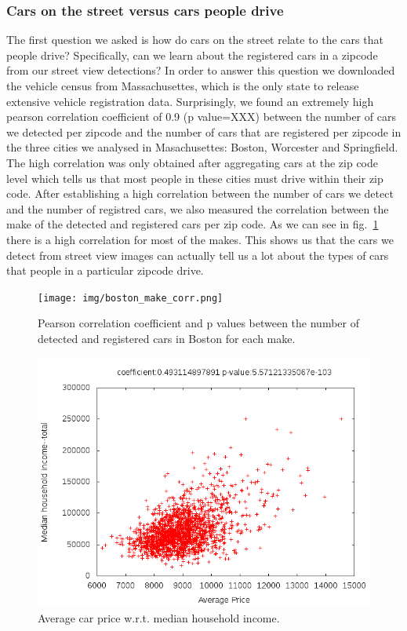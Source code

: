 \documentclass[10pt,twocolumn,letterpaper]{article}
\begin{document}
\subsubsection{Cars on the street versus cars people drive}
The first question we asked is how do cars on the street relate to the cars that people drive? Specifically,
can we learn about the registered cars in a zipcode from our street view detections?
In order to answer this question we downloaded the vehicle census from Massachusettes, which is the only state to release extensive vehicle registration data. Surprisingly, we found an extremely high pearson correlation coefficient of 0.9 (p value=XXX) between the number of cars we detected per zipcode and the number of cars that are registered per zipcode in the three cities we analysed in Masachusettes: Boston, Worcester and Springfield. The high correlation was only obtained after aggregating cars at the zip code level which tells us that most people in these cities must drive within their zip code. 
After establishing a high correlation between the number of cars we detect and the number of registred cars, we also measured the correlation between the make of the detected and registered cars per zip code. As we can see in fig.~\ref{fig:ma_corrs} there is a high correlation for most of the makes. This shows us that the cars we detect from street view images can actually tell us a lot about the types of cars that people in a particular zipcode drive.

\begin{figure} [t]
\begin{center}
\texttt{[image: img/boston\_make\_corr.png]}
\end{center}
\caption {Pearson correlation coefficient and p values between the number of detected and registered cars in Boston for each make.}
\label{fig:ma_corrs}
\end{figure}


\begin{figure}[t]
\begin{center}
   \includegraphics[width=0.8\linewidth]{img/averagePriceIncome.png}
\end{center}
   \caption {Average car price w.r.t. median household income.}
\label{fig:price-income-corr}
\end{figure}
\end{document}
